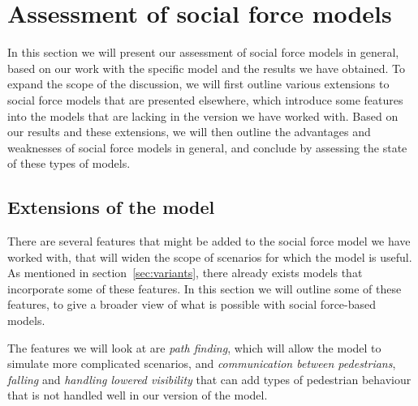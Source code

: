 \section{Assessment of social force models}
\label{sec:assessment}
In this section we will present our assessment of social force models in 
general, based on our work with the specific model and the results we have 
obtained. To expand the scope of the discussion, we will first outline various 
extensions to social force models that are presented elsewhere, which 
introduce some features into the models that are lacking in the version we 
have worked with. Based on our results and these extensions, we will then 
outline the advantages and weaknesses of social force models in general, and 
conclude by assessing the state of these types of models.

\subsection{Extensions of the model}
There are several features that might be added to the social force model we 
have worked with, that will widen the scope of scenarios for which the model 
is useful. As mentioned in section~\ref{sec:variants}, there already exists 
models that incorporate some of these features. In this section we will 
outline some of these features, to give a broader view of what is possible 
with social force-based models.

The features we will look at are \emph{path finding}, which will allow the 
model to simulate more complicated scenarios, and \emph{communication between 
pedestrians}, \emph{falling} and \emph{handling lowered visibility} that can 
add types of pedestrian behaviour that is not handled well in our version of 
the model.

